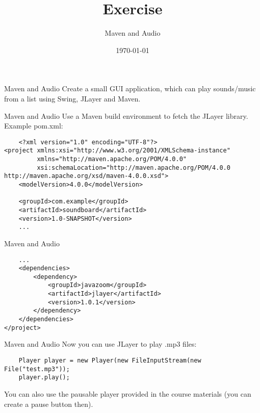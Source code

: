 


\title{Exercise}
\subtitle{Maven and Audio}
\date{\today}




\begin{frame}
    \titlepage
\end{frame}

\begin{frame}[fragile]{Maven and Audio}
    Create a small GUI application, which can play sounds/music from a list using Swing, JLayer and Maven.
\end{frame}

\begin{frame}[fragile]{Maven and Audio}
    Use a Maven build environment to fetch the JLayer library. Example pom.xml:
    \begin{lstlisting}
    <?xml version="1.0" encoding="UTF-8"?>
<project xmlns:xsi="http://www.w3.org/2001/XMLSchema-instance"
         xmlns="http://maven.apache.org/POM/4.0.0"
         xsi:schemaLocation="http://maven.apache.org/POM/4.0.0 http://maven.apache.org/xsd/maven-4.0.0.xsd">
    <modelVersion>4.0.0</modelVersion>
    
    <groupId>com.example</groupId>
    <artifactId>soundboard</artifactId>
    <version>1.0-SNAPSHOT</version>
    ...\end{lstlisting}
\end{frame}

\begin{frame}[fragile]{Maven and Audio}
\begin{lstlisting}
    ...
    <dependencies>
        <dependency>
            <groupId>javazoom</groupId>
            <artifactId>jlayer</artifactId>
            <version>1.0.1</version>
        </dependency>
    </dependencies>
</project>\end{lstlisting}
\end{frame}

\begin{frame}[fragile]{Maven and Audio}
    Now you can use JLayer to play .mp3 files:
    \begin{lstlisting}
    Player player = new Player(new FileInputStream(new File("test.mp3"));
    player.play();\end{lstlisting}
    You can also use the pausable player provided in the course materials (you can create a pause button then).
\end{frame}

